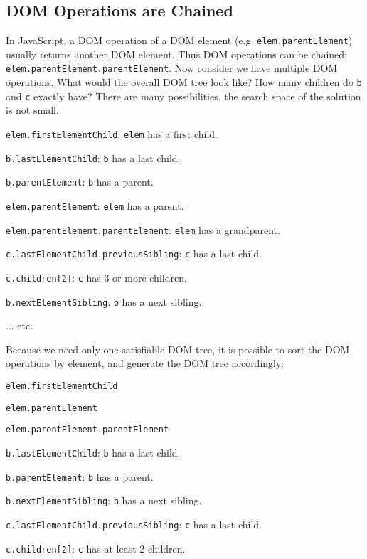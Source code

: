 \subsection{DOM Operations are Chained}
In JavaScript, a DOM operation of a DOM element (e.g. {\tt elem.parentElement}) usually returns another DOM element.  Thus DOM operations can be chained: {\tt elem.parentElement.parentElement}.  
Now consider we have multiple DOM operations.  What would the overall DOM tree look like?  How many children do {\tt b} and {\tt c} exactly have?  There are many possibilities, the search space of the solution is not small.    
\begin{compactitem}
\item {\tt elem.firstElementChild}: {\tt elem} has a first child.
\item {\tt b.lastElementChild}: {\tt b} has a last child.
\item {\tt b.parentElement}: {\tt b} has a parent.
\item {\tt elem.parentElement}: {\tt elem} has a parent.
\item {\tt elem.parentElement.parentElement}: {\tt elem} has a grandparent.
\item {\tt c.lastElementChild.previousSibling}: {\tt c} has a last child.
\item {\tt c.children[2]}: {\tt c} has 3 or more children.
\item {\tt b.nextElementSibling}: {\tt b} has a next sibling. 
\item ... etc.
\end{compactitem}

Because we need only one satisfiable DOM tree, it is possible to sort the DOM operations by element, and generate the DOM tree accordingly: 
\begin{compactitem}
\item {\tt elem.firstElementChild} 
\item {\tt elem.parentElement}
\item {\tt elem.parentElement.parentElement}
\end{compactitem}
\begin{compactitem}
\item {\tt b.lastElementChild}: {\tt b} has a last child.
\item {\tt b.parentElement}: {\tt b} has a parent.
\item {\tt b.nextElementSibling}: {\tt b} has a next sibling. 
\end{compactitem}
\begin{compactitem}
\item {\tt c.lastElementChild.previousSibling}: {\tt c} has a last child.
\item {\tt c.children[2]}: {\tt c} has at least 2 children.
\end{compactitem} 

